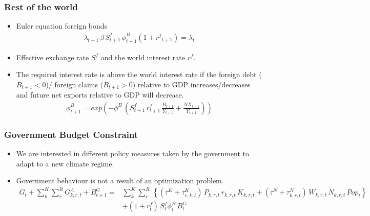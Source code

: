 \documentclass[11pt,aspectratio=169]{beamer}
\begin{document}
\begin{frame}
\frametitle{Rest of the world}
\scriptsize
\begin{itemize}
\item Euler equation foreign bonds
\begin{align*}
\lambda_{t+1} \, \beta \, S^{f}_{t+1} \, \phi^{B}_{t+1} \left(1+{{r^{f}}_{t+1}}\right) = \lambda_{t}
\end{align*}
\item Effective exchange rate $S^f$ and the world interest rate $r^f$.
\item The required interest rate is above the world interest rate if the foreign debt ($B_{t+1}<0$)/ foreign claims ($B_{t+1}>0$) relative to GDP increases/decreases and future net exports relative to GDP will decrease. 
\begin{align*}
\phi^{B}_{t+1} = exp \left(-\phi^B \,(S^{f}_{t+1} \, r^{f}_{t+1} \, \frac{B_{t+1}}{Y_{t+1}}+\frac{NX_{t+1}}{Y_{t+1}})\right)
\end{align*}
\end{itemize}
\end{frame}


\begin{frame}
\frametitle{Government Budget Constraint}
\scriptsize
\begin{itemize}
\item We are interested in different policy measures taken by the government to adapt to a new climate regime. 
\item Government behaviour is not a result of an optimization problem. 
\begin{align*}
G_{t} + \sum_{k}^{K} \sum_{r}^{R} G^{A}_{k,r,t} + B^G_{t+1} =& \sum_{k}^{K} \sum_{r}^{R} \, \left\lbrace (\tau^{K} + \tau_{r,k,t}^{K}) \, P_{k,r,t} \, r_{k,r,t} \, K_{k,r,t} + (\tau^{N} + \tau_{k,r,t}^{N}) \, W_{k,r,t} \, N_{k,r,t} \, Pop_{t} \right\rbrace \nonumber \\
& + (1 + r^{f}_{t}) \, S^{f}_{t} \phi^{B}_{t} \, B^G_{t}
\end{align*}
\end{itemize}
\end{frame}
\end{document}
